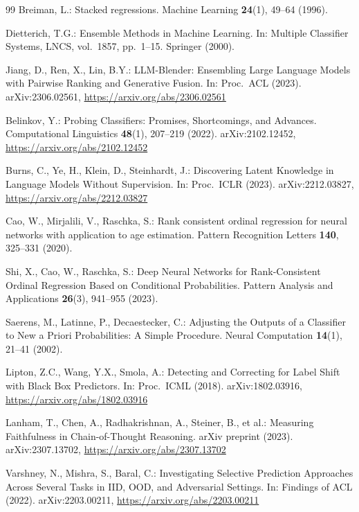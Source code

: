 \documentclass[runningheads]{llncs}
\begin{document}
\begin{thebibliography}{99}
Breiman, L.: Stacked regressions. Machine Learning \textbf{24}(1), 49--64 (1996). 

Dietterich, T.G.: Ensemble Methods in Machine Learning. In: Multiple Classifier Systems, LNCS, vol.~1857, pp.~1--15. Springer (2000). 

Jiang, D., Ren, X., Lin, B.Y.: LLM-Blender: Ensembling Large Language Models with Pairwise Ranking and Generative Fusion. In: Proc.\ ACL (2023). arXiv:2306.02561, \url{https://arxiv.org/abs/2306.02561}

Belinkov, Y.: Probing Classifiers: Promises, Shortcomings, and Advances. Computational Linguistics \textbf{48}(1), 207--219 (2022). arXiv:2102.12452, \url{https://arxiv.org/abs/2102.12452}

Burns, C., Ye, H., Klein, D., Steinhardt, J.: Discovering Latent Knowledge in Language Models Without Supervision. In: Proc.\ ICLR (2023). arXiv:2212.03827, \url{https://arxiv.org/abs/2212.03827}

Cao, W., Mirjalili, V., Raschka, S.: Rank consistent ordinal regression for neural networks with application to age estimation. Pattern Recognition Letters \textbf{140}, 325--331 (2020). 

Shi, X., Cao, W., Raschka, S.: Deep Neural Networks for Rank-Consistent Ordinal Regression Based on Conditional Probabilities. Pattern Analysis and Applications \textbf{26}(3), 941--955 (2023). 

Saerens, M., Latinne, P., Decaestecker, C.: Adjusting the Outputs of a Classifier to New a Priori Probabilities: A Simple Procedure. Neural Computation \textbf{14}(1), 21--41 (2002). 

Lipton, Z.C., Wang, Y.X., Smola, A.: Detecting and Correcting for Label Shift with Black Box Predictors. In: Proc.\ ICML (2018). arXiv:1802.03916, \url{https://arxiv.org/abs/1802.03916}

Lanham, T., Chen, A., Radhakrishnan, A., Steiner, B., et al.: Measuring Faithfulness in Chain-of-Thought Reasoning. arXiv preprint (2023). arXiv:2307.13702, \url{https://arxiv.org/abs/2307.13702}

Varshney, N., Mishra, S., Baral, C.: Investigating Selective Prediction Approaches Across Several Tasks in IID, OOD, and Adversarial Settings. In: Findings of ACL (2022). arXiv:2203.00211, \url{https://arxiv.org/abs/2203.00211}


\end{thebibliography}
\end{document}

